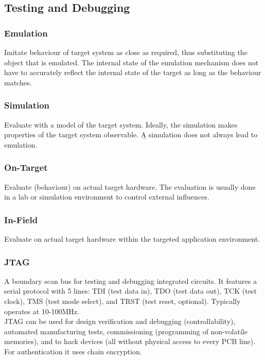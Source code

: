 \subsection{Testing and Debugging}
\subsubsection{Emulation}
Imitate behaviour of target system as close as required, thus substituting the object that is emulated. The internal state of the emulation mechanism does not have to accurately reflect the internal state of the target as long as the behaviour matches.

\subsubsection{Simulation}
Evaluate with a model of the target system. Ideally, the simulation makes properties of the target system observable. \b{A simulation does not always lead to emulation.}

\subsubsection{On-Target}
Evaluate (behaviour) on actual target hardware. The evaluation is usually done in a lab or simulation environment to control external influences.

\subsubsection{In-Field}
Evaluate on actual target hardware within the targeted application environment.

\subsubsection{JTAG}
A boundary scan bus for testing and debugging integrated circuits. It features a serial protocol with 5 lines: TDI (test data in), TDO (test data out), TCK (test clock), TMS (test mode select), and TRST (test reset, optional). Typically operates at 10-100MHz.\\
JTAG can be used for design verification and debugging (controllability), automated manufacturing tests, commissioning (programming of non-volatile memories), and to hack devices (all without physical access to every PCB line). For authentication it uses chain encryption.



